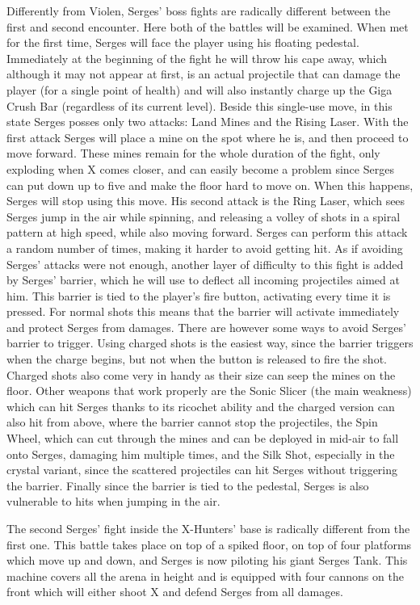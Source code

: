 Differently from Violen, Serges' boss fights are radically different between the first and second encounter. Here both of the battles will be examined.
When met for the first time, Serges will face the player using his floating pedestal. Immediately at the beginning of the fight he will throw his cape away, which although it may not appear at first, is an actual projectile that can damage the player (for a single point of health) and will also instantly charge up the Giga Crush Bar (regardless of its current level). Beside this single-use move, in this state Serges posses only two 
attacks: Land Mines and the Rising Laser. With the first attack Serges will place a mine on the spot where he is, and then proceed to move forward. These mines remain for the whole duration of the fight, only exploding when X comes closer, and can easily become a problem since Serges can put down up to five and make the floor hard to move on. When this happens, Serges will stop using this move. His second attack is the Ring Laser, which sees Serges jump in the air while spinning, and releasing a volley of shots in a spiral pattern at high speed, while also moving forward. Serges can perform this attack a random number of times, making it harder to avoid getting hit. As if avoiding Serges' attacks were not enough, another layer of difficulty to this fight is added by Serges' barrier, which he will use to deflect all incoming projectiles aimed at him. This barrier is tied to the player's fire button, activating every time it is pressed. For normal shots this means that the barrier will activate immediately and protect Serges from damages. There are however some ways to avoid Serges' barrier to trigger. Using charged shots is the easiest way, since the barrier triggers when the charge begins, but not when the button is released to fire the shot. Charged shots also come very in handy as their size can seep the mines on the floor. Other weapons that work properly are the Sonic Slicer (the main weakness) which can hit Serges thanks to its ricochet ability and the charged version can also hit from above, where the barrier cannot stop the projectiles, the Spin Wheel, which can cut through the mines and can be deployed in mid-air to fall onto Serges, damaging him multiple times, and the Silk Shot, especially in the crystal variant, since the scattered projectiles can hit Serges without triggering the barrier. Finally since the barrier is tied to the pedestal, Serges is also vulnerable to hits when jumping in the air.

The second Serges' fight inside the X-Hunters' base is radically different from the first one. This battle takes place on top of a spiked floor, on top of four platforms which move up and down, and Serges is now piloting his giant Serges Tank. This machine covers all the arena in height and is equipped with four cannons on the front which will either shoot X and defend Serges from all damages. 

